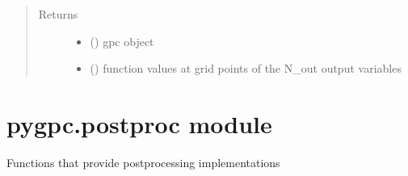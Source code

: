 \documentclass[letterpaper,10pt,english,openany,oneside]{sphinxmanual}
\begin{document}
\begin{fulllineitems}
\begin{quote}
\begin{description}
\begin{itemize}
\end{itemize}

\item[{Returns}] \leavevmode
\begin{itemize}
\item {} 
 () \textendash{} gpc object

\item {} 
 () \textendash{} function values at grid points of the N\_out output variables

\end{itemize}


\end{description}\end{quote}

\end{fulllineitems}



\section{pygpc.postproc module}
\label{\detokenize{pygpc:module-pygpc.postproc}}\label{\detokenize{pygpc:pygpc-postproc-module}}
Functions that provide postprocessing implementations
\end{document}
